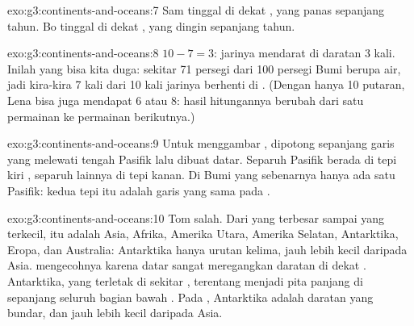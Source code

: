 \begin{solution}{exo:g3:continents-and-oceans:7}
Sam tinggal di dekat , yang panas sepanjang tahun. Bo tinggal
di dekat , yang dingin sepanjang tahun.
\end{solution}

\begin{solution}{exo:g3:continents-and-oceans:8}
$10 - 7 = 3$: jarinya mendarat di daratan 3 kali. Inilah yang bisa kita
duga: sekitar 71 persegi dari 100 persegi Bumi berupa air, jadi kira-kira
7 kali dari 10 kali jarinya berhenti di . (Dengan hanya 10 putaran,
Lena bisa juga mendapat 6 atau 8: hasil hitungannya berubah dari satu
permainan ke permainan berikutnya.)
\end{solution}

\begin{solution}{exo:g3:continents-and-oceans:9}
Untuk menggambar ,  dipotong sepanjang garis yang
melewati tengah  Pasifik lalu dibuat datar. Separuh  Pasifik
berada di tepi kiri , separuh lainnya di tepi kanan. Di Bumi yang
sebenarnya hanya ada satu  Pasifik: kedua tepi  itu adalah
garis yang sama pada .
\end{solution}

\begin{solution}{exo:g3:continents-and-oceans:10}
Tom salah. Dari yang terbesar sampai yang terkecil,  itu adalah
Asia, Afrika, Amerika Utara, Amerika Selatan, Antarktika, Eropa, dan
Australia: Antarktika hanya urutan kelima, jauh lebih kecil daripada Asia.
 mengecohnya karena  datar sangat meregangkan daratan di
dekat . Antarktika, yang terletak di sekitar , terentang
menjadi pita panjang di sepanjang seluruh bagian bawah . Pada , Antarktika adalah daratan yang bundar, dan jauh lebih kecil daripada
Asia.
\end{solution}
